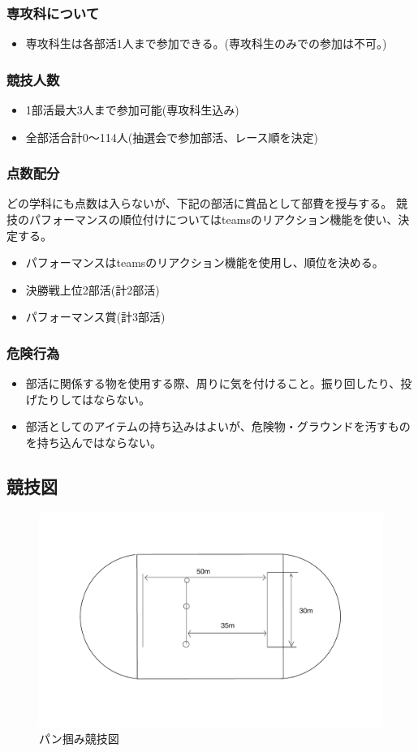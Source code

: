 \documentclass[titlepage]{jarticle}
\begin{document}
   \subsubsection{専攻科について}
    \begin{itemize}
     \item 専攻科生は各部活1人まで参加できる。(専攻科生のみでの参加は不可。)
    \end{itemize}
   \subsubsection{競技人数}
    \begin{itemize}
     \item 1部活最大3人まで参加可能(専攻科生込み)
     \item 全部活合計0～114人(抽選会で参加部活、レース順を決定)
    \end{itemize}
   \subsubsection{点数配分}
     どの学科にも点数は入らないが、下記の部活に賞品として部費を授与する。
競技のパフォーマンスの順位付けについてはteamsのリアクション機能を使い、決定する。
    \begin{itemize}
     \item パフォーマンスはteamsのリアクション機能を使用し、順位を決める。
     \item 決勝戦上位2部活(計2部活)
     \item パフォーマンス賞(計3部活)
    \end{itemize}
   \subsubsection{危険行為}
    \begin{itemize}
     \item 部活に関係する物を使用する際、周りに気を付けること。振り回したり、投げたりしてはならない。
     \item 部活としてのアイテムの持ち込みはよいが、危険物・グラウンドを汚すものを持ち込んではならない。
    \end{itemize}
  \subsection{競技図}
   \begin{figure}[H]
    \centering
    \includegraphics[width=12cm]{bread.pdf}
    \caption{パン掴み競技図}
   \end{figure}
\end{document}

